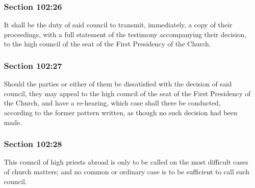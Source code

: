 	\subsubsection{Section 102:26} %
		\label{DC102-26}

		It shall be the duty of said council to transmit, immediately, a copy of their proceedings, with a full statement of the testimony accompanying their decision, to the high council of the seat of the First Presidency of the Church.


	\subsubsection{Section 102:27} %
		\label{DC102-27}

		Should the parties or either of them be dissatisfied with the decision of said council, they may appeal to the high council of the seat of the First Presidency of the Church, and have a re-hearing, which case shall there be conducted, according to the former pattern written, as though no such decision had been made.


	\subsubsection{Section 102:28} %
		\label{DC102-28}

		This council of high priests abroad is only to be called on the most difficult cases of church matters; and no common or ordinary case is to be sufficient to call such council.

